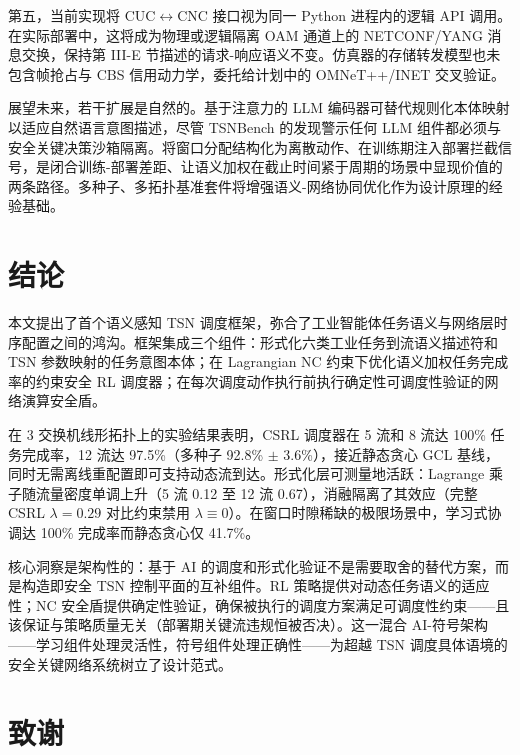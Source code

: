 \documentclass[UTF8]{ctexart}
\begin{document}
第五，当前实现将 CUC$\leftrightarrow$CNC 接口视为同一 Python 进程内的逻辑 API 调用。在实际部署中，这将成为物理或逻辑隔离 OAM 通道上的 NETCONF/YANG 消息交换，保持第 III-E 节描述的请求-响应语义不变。仿真器的存储转发模型也未包含帧抢占与 CBS 信用动力学，委托给计划中的 OMNeT++/INET 交叉验证。

展望未来，若干扩展是自然的。基于注意力的 LLM 编码器可替代规则化本体映射以适应自然语言意图描述，尽管 TSNBench 的发现警示任何 LLM 组件都必须与安全关键决策沙箱隔离。将窗口分配结构化为离散动作、在训练期注入部署拦截信号，是闭合训练-部署差距、让语义加权在截止时间紧于周期的场景中显现价值的两条路径。多种子、多拓扑基准套件将增强语义-网络协同优化作为设计原理的经验基础。

\section{结论}

本文提出了首个语义感知 TSN 调度框架，弥合了工业智能体任务语义与网络层时序配置之间的鸿沟。框架集成三个组件：形式化六类工业任务到流语义描述符和 TSN 参数映射的任务意图本体；在 Lagrangian NC 约束下优化语义加权任务完成率的约束安全 RL 调度器；在每次调度动作执行前执行确定性可调度性验证的网络演算安全盾。

在 3 交换机线形拓扑上的实验结果表明，CSRL 调度器在 5 流和 8 流达 100\% 任务完成率，12 流达 97.5\%（多种子 92.8\% $\pm$ 3.6\%），接近静态贪心 GCL 基线，同时无需离线重配置即可支持动态流到达。形式化层可测量地活跃：Lagrange 乘子随流量密度单调上升（5 流 0.12 至 12 流 0.67），消融隔离了其效应（完整 CSRL $\lambda=0.29$ 对比约束禁用 $\lambda\equiv0$）。在窗口时隙稀缺的极限场景中，学习式协调达 100\% 完成率而静态贪心仅 41.7\%。

核心洞察是架构性的：基于 AI 的调度和形式化验证不是需要取舍的替代方案，而是构造即安全 TSN 控制平面的互补组件。RL 策略提供对动态任务语义的适应性；NC 安全盾提供确定性验证，确保被执行的调度方案满足可调度性约束——且该保证与策略质量无关（部署期关键流违规恒被否决）。这一混合 AI-符号架构——学习组件处理灵活性，符号组件处理正确性——为超越 TSN 调度具体语境的安全关键网络系统树立了设计范式。

\section*{致谢}
\end{document}
